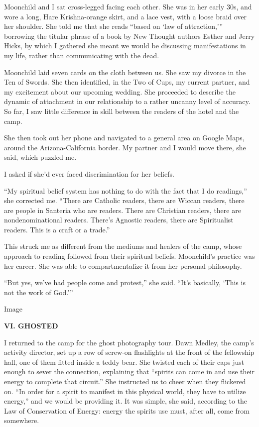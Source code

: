 Moonchild and I sat cross-legged facing each other. She was in her early
30s, and wore a long, Hare Krishna-orange skirt, and a lace vest, with a
loose braid over her shoulder. She told me that she reads ``based on
`law of attraction,''' borrowing the titular phrase of a book by New
Thought authors Esther and Jerry Hicks, by which I gathered she meant we
would be discussing manifestations in my life, rather than communicating
with the dead.

Moonchild laid seven cards on the cloth between us. She saw my divorce
in the Ten of Swords. She then identified, in the Two of Cups, my
current partner, and my excitement about our upcoming wedding. She
proceeded to describe the dynamic of attachment in our relationship to a
rather uncanny level of accuracy. So far, I saw little difference in
skill between the readers of the hotel and the camp.

She then took out her phone and navigated to a general area on Google
Maps, around the Arizona-California border. My partner and I would move
there, she said, which puzzled me.

I asked if she'd ever faced discrimination for her beliefs.

``My spiritual belief system has nothing to do with the fact that I do
readings,'' she corrected me. ``There are Catholic readers, there are
Wiccan readers, there are people in Santeria who are readers. There are
Christian readers, there are nondenominational readers. There's Agnostic
readers, there are Spiritualist readers. This is a craft or a trade.''

This struck me as different from the mediums and healers of the camp,
whose approach to reading followed from their spiritual beliefs.
Moonchild's practice was her career. She was able to compartmentalize it
from her personal philosophy.

``But yes, we've had people come and protest,'' she said. ``It's
basically, `This is not the work of God.'''

Image

\textbf{VI. GHOSTED}

I returned to the camp for the ghost photography tour. Dawn Medley, the
camp's activity director, set up a row of screw-on flashlights at the
front of the fellowship hall, one of them fitted inside a teddy bear.
She twisted each of their caps just enough to sever the connection,
explaining that ``spirits can come in and use their energy to complete
that circuit.'' She instructed us to cheer when they flickered on. ``In
order for a spirit to manifest in this physical world, they have to
utilize energy,'' and we would be providing it. It was simple, she said,
according to the Law of Conservation of Energy: energy the spirits use
must, after all, come from somewhere.

